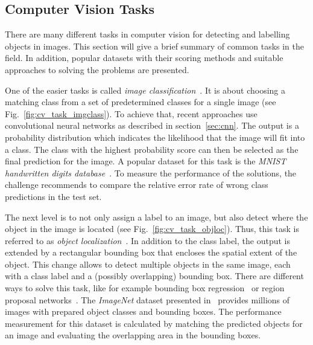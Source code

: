 \subsection{Computer Vision Tasks}
There are many different tasks in computer vision for detecting and labelling objects in images. This section will give a brief summary of common tasks in the field. In addition, popular datasets with their scoring methods and suitable approaches to solving the problems are presented.

One of the easier tasks is called \emph{image classification}~\cite[p.~98]{DLbook16}. It is about choosing a matching class from a set of predetermined classes for a single image (see Fig.~\ref{fig:cv_task_imgclass}). To achieve that, recent approaches use convolutional neural networks as described in section~\ref{sec:cnn}. The output is a probability distribution which indicates the likelihood that the image will fit into a class. The class with the highest probability score can then be selected as the final prediction for the image. A popular dataset for this task is the \emph{MNIST handwritten digits database}~\cite{mnist10}. To measure the performance of the solutions, the challenge recommends to compare the relative error rate of wrong class predictions in the test set.

The next level is to not only assign a label to an image, but also detect where the object in the image is located (see Fig.~\ref{fig:cv_task_objloc}). Thus, this task is referred to as \emph{object localization}~\cite{rcnn14}. In addition to the class label, the output is extended by a rectangular bounding box that encloses the spatial extent of the object. This change allows to detect multiple objects in the same image, each with a class label and a (possibly overlapping) bounding box. There are different ways to solve this task, like for example bounding box regression~\cite{obj_detection13} or region proposal networks~\cite{ff-rcnn14}. The \emph{ImageNet} dataset presented in~\cite{imgnet09} provides millions of images with prepared object classes and bounding boxes. The performance measurement for this dataset is calculated by matching the predicted objects for an image and evaluating the overlapping area in the bounding boxes.

